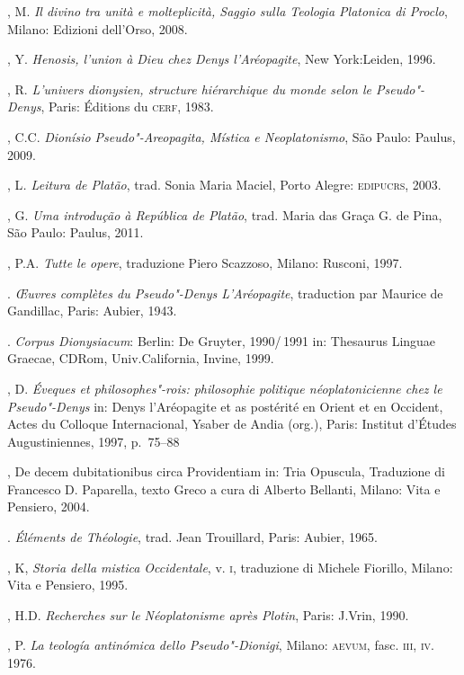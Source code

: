 {\begin{description}
, M. \emph{Il divino tra unità e molteplicità, Saggio sulla
Teologia Platonica di Proclo}, Milano: Edizioni dell’Orso, 2008.

, Y. \emph{Henosis, l’union à Dieu chez Denys l’Aréopagite}, New
York:Leiden, 1996.

, R. \emph{L’univers dionysien, structure hiérarchique du monde
selon le Pseudo"-Denys}, Paris: Éditions du \textsc{cerf}, 1983.

, C.C. \emph{Dionísio Pseudo"-Areopagita, Mística e
Neoplatonismo}, São Paulo: Paulus, 2009.

, L\emph{. Leitura de Platão}, trad. Sonia Maria Maciel, Porto
Alegre: \textsc{edipucrs}, 2003.

, G. \emph{Uma introdução à República de Platão}, trad. Maria
das Graça G. de Pina, São Paulo: Paulus, 2011.

, P.A. \emph{Tutte le opere}, traduzione Piero Scazzoso,
Milano: Rusconi, 1997.

\titidem. \emph{Œuvres complètes du Pseudo"-Denys
L’Aréopagite}, traduction par Maurice de Gandillac, Paris: Aubier,
1943.

\titidem. \emph{Corpus Dionysiacum}: Berlin: De
Gruyter, 1990/\,1991 in: Thesaurus Linguae Graecae, \textsc{CDR}om,
Univ.California, Invine, 1999.

, D. \emph{Éveques et philosophes"-rois: philosophie politique
néoplatonicienne chez le Pseudo"-Denys} in: Denys l’Aréopagite et as
postérité en Orient et en Occident, Actes du Colloque Internacional,
Ysaber de Andia (org.), Paris: Institut d’Études Augustiniennes, 1997,
p.~75--88

, De decem dubitationibus circa Providentiam in: Tria Opuscula,
Traduzione di Francesco D. Paparella, texto Greco a cura di Alberto
Bellanti, Milano: Vita e Pensiero, 2004.

\titidem. \emph{Éléments de Théologie}, trad. Jean Trouillard,
Paris: Aubier, 1965.

, K, \emph{Storia della mistica Occidentale}, v. \textsc{i}, traduzione di
Michele Fiorillo, Milano: Vita e Pensiero, 1995.

, H.D. \emph{Recherches sur le Néoplatonisme après Plotin},
Paris: J.Vrin, 1990.

, P. \emph{La teología antinómica dello Pseudo"-Dionigi},
Milano: \textsc{aevum}, fasc. \textsc{iii}, \textsc{iv}. 1976.


\end{description}}
